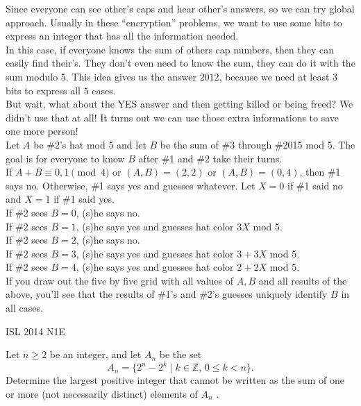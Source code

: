 \begin{solution}[MellowMelon]
    Since everyone can see other's caps and hear other's answers, so we can
    try global approach. Usually in these ``encryption'' problems, we want to
    use some bits to express an integer that has all the information needed.\\

    In this case, if everyone knows the sum of others cap numbers, then they
    can easily find their's. They don't even need to know the sum, they can do
    it with the sum modulo $5$. This idea gives us the answer $2012$, because
    we need at least $3$ bits to express all $5$ cases.\\

    But wait, what about the YES answer and then getting killed or being
    freed? We didn't use that at all! It turns out we can use those extra
    informations to save one more person!\\

    Let $A$ be \#2's hat mod 5 and let $B$ be the sum of \#3 through \#2015 mod
    5. The goal is for everyone to know $B$ after \#1 and \#2 take their
    turns.\\

    If $A+B \equiv 0,1 \pmod{4}$ or $(A,B) = (2,2)$ or $(A,B) = (0,4)$, then
    \#1 says no. Otherwise, \#1 says yes and guesses whatever. Let $X = 0$ if \#1
    said no and $X = 1$ if \#1 said yes.\\

    If \#2 sees $B = 0$, (s)he says no.\\
    If \#2 sees $B = 1$, (s)he says yes and guesses hat color $3X$ mod 5.\\
    If \#2 sees $B = 2$, (s)he says no.\\
    If \#2 sees $B = 3$, (s)he says yes and guesses hat color $3 + 3X$ mod
    5.\\
    If \#2 sees $B = 4$, (s)he says yes and guesses hat color $2 + 2X$ mod
    5.\\

    If you draw out the five by five grid with all values of $A,B$ and all
    results of the above, you'll see that the results of \#1's and \#2's
    guesses uniquely identify $B$ in all cases.
\end{solution}


{ISL 2014 N1}{E}{
    Let $n \ge 2$ be an integer, and let $A_n$ be the set \[A_n = \{2^n -
    2^k\mid k \in \mathbb{Z},\, 0 \le k < n\}.\] Determine the largest positive
    integer that cannot be written as the sum of one or more (not necessarily
    distinct) elements of $A_n$ .

}

